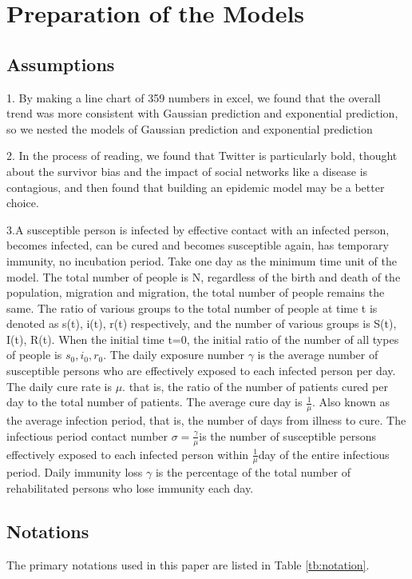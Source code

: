 \documentclass[12pt]{article}  %
\begin{document}
\section{Preparation of the Models}
\subsection{Assumptions}
1. By making a line chart of 359 numbers in excel, we found that the overall trend was more consistent with Gaussian prediction and exponential prediction, so we nested the models of Gaussian prediction and exponential prediction

2. In the process of reading, we found that Twitter is particularly bold, thought about the survivor bias and the impact of social networks like a disease is contagious, and then found that building an epidemic model may be a better choice.

3.A susceptible person is infected by effective contact with an infected person, becomes infected, can be cured and becomes susceptible again, has temporary immunity, no incubation period. Take one day as the minimum time unit of the model. The total number of people is N, regardless of the birth and death of the population, migration and migration, the total number of people remains the same. The ratio of various groups to the total number of people at time t is denoted as s(t), i(t), r(t) respectively, and the number of various groups is S(t), I(t), R(t). When the initial time t=0, the initial ratio of the number of all types of people is $s_0, i_0, r_0$. The daily exposure number $\gamma$ is the average number of susceptible persons who are effectively exposed to each infected person per day. The daily cure rate is $\mu$. that is, the ratio of the number of patients cured per day to the total number of patients. The average cure day is $\frac{1}{\mu}$. Also known as the average infection period, that is, the number of days from illness to cure. The infectious period contact number $\sigma=\frac{\gamma}{\mu}$is the number of susceptible persons effectively exposed to each infected person within $\frac{1}{\mu}$day of the entire infectious period. Daily immunity loss $\gamma$ is the percentage of the total number of rehabilitated persons who lose immunity each day.

\subsection{Notations}
The primary notations used in this paper are listed in Table \ref{tb:notation}.
\end{document}
